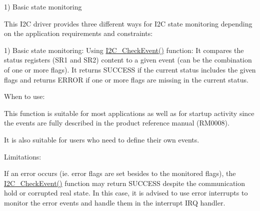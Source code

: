 1) Basic state monitoring

This I2C driver provides three different ways for I2C state monitoring depending on the application requirements and constraints\+:

1) Basic state monitoring\+: Using \hyperlink{group___i2_c___private___functions_ga2d5701342f9d4c1f09bf9d3cdcacc326}{I2\+C\+\_\+\+Check\+Event()} function\+: It compares the status registers (S\+R1 and S\+R2) content to a given event (can be the combination of one or more flags). It returns S\+U\+C\+C\+E\+SS if the current status includes the given flags and returns E\+R\+R\+OR if one or more flags are missing in the current status.
\begin{DoxyItemize}
\item When to use\+:
\begin{DoxyItemize}
\item This function is suitable for most applications as well as for startup activity since the events are fully described in the product reference manual (R\+M0008).
\item It is also suitable for users who need to define their own events.
\end{DoxyItemize}
\item Limitations\+:
\begin{DoxyItemize}
\item If an error occurs (ie. error flags are set besides to the monitored flags), the \hyperlink{group___i2_c___private___functions_ga2d5701342f9d4c1f09bf9d3cdcacc326}{I2\+C\+\_\+\+Check\+Event()} function may return S\+U\+C\+C\+E\+SS despite the communication hold or corrupted real state. In this case, it is advised to use error interrupts to monitor the error events and handle them in the interrupt I\+RQ handler.


\end{DoxyItemize}
\end{DoxyItemize}
